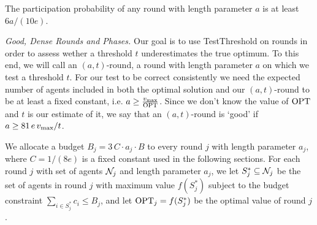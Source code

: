 \begin{lemma}\label{lemma:PART}
The participation probability of any round with length parameter $a$ is at least $6a/(10e)$. 
\end{lemma}




\textit{Good, Dense Rounds and Phases.}
%
%
Our goal is to use TestThreshold on rounds in order to assess wether a threshold $t$ underestimates the true optimum. To this end, we will call an $\left(a,t\right)$-round, a round with length parameter $a$ on which we test a threshold $t$. For our test to be correct consistently we need the expected number of agents included in both the optimal solution and our $\left(a,t\right)$-round to be at least a fixed constant, i.e. $a\ge \frac{v_{\text{max}}}{\mathrm{OPT}}$. Since we don't know the value of $\mathrm{OPT}$ and $t$ is our estimate of it, we say that an $\left(a,t\right)$-round is `good' if $a\ge 81\, e\, v_{\text{max}}/t$. 

We allocate a budget $B_j = 3 \, C \cdot a_j \cdot B$ to every round $j$ with length parameter $a_j$, where $C = 1/(8e)$ is a fixed constant used in the following sections. For each round $j$ with set of agents $\mathcal{N}_j$ and length parameter $a_j$, we let $S^\ast_j \subseteq \mathcal{N}_j$ be the set of agents in round $j$ with maximum value $f(S^\ast_j)$ subject to the budget constraint $\sum_{ i \in S_j^\ast} c_i \leq B_j$, and let $\mathrm{OPT}_j = f(S^\ast_j)$ be the optimal value of round $j$. 

